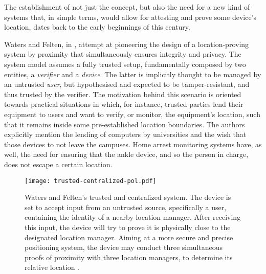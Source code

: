 The establishment of not just the concept, but also the need for a new kind of systems that, in simple terms, would allow for attesting and prove some device's location, dates back to the early beginnings of this century. 

Waters and Felten, in \cite{waters2003secure}, attempt at pioneering the design of a location-proving system by proximity that simultaneously ensures integrity and privacy. The system model assumes a fully trusted setup, fundamentally composed by two entities, a \emph{verifier} and a \emph{device}. The latter is implicitly thought to be managed by an untrusted \emph{user}, but hypothesised and expected to be tamper-resistant, and thus trusted by the verifier. The motivation behind this scenario is oriented towards practical situations in which, for instance, trusted parties lend their equipment to users and want to verify, or monitor, the equipment's location, such that it remains inside some pre-established location boundaries. The authors explicitly mention the lending of computers by universities and the wish that those devices to not leave the campuses. Home arrest monitoring systems have, as well, the need for ensuring that the ankle device, and so the person in charge, does not escape a certain location. 

\begin{figure}[ht]
    \begin{center}
    \texttt{[image: trusted-centralized-pol.pdf]}
    \caption{Waters and Felten's trusted and centralized \pol{} system. The device is set to accept input from an untrusted source, specifically a user, containing the identity of a nearby location manager. After receiving this input, the device will try to prove it is physically close to the designated location manager. Aiming at a more secure and precise positioning system, the device may conduct three simultaneous proofs of proximity with three location managers, to determine its relative location \cite{waters2003secure}.}
    \label{fig:trusted-centralized-pol}
    \end{center}
\end{figure}

